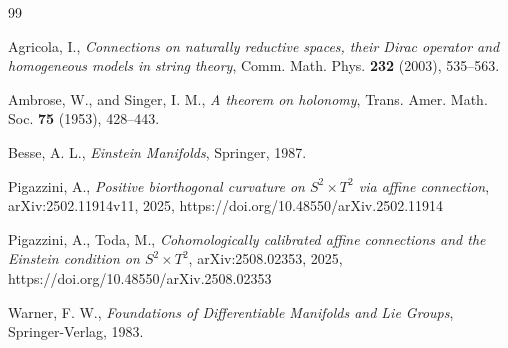 \documentclass[12pt]{article}
\begin{document}

\begin{thebibliography}{99}

 Agricola, I., \emph{Connections on naturally reductive spaces, their Dirac operator and homogeneous models in string theory}, Comm. Math. Phys. \textbf{232} (2003), 535--563.

 Ambrose, W., and Singer, I. M., \emph{A theorem on holonomy}, Trans. Amer. Math. Soc. \textbf{75} (1953), 428--443.

 Besse, A. L., \emph{Einstein Manifolds}, Springer, 1987.

Pigazzini, A., \emph{Positive biorthogonal curvature on $S^2 \times T^2$ via affine connection}, arXiv:2502.11914v11, 2025, 
https://doi.org/10.48550/arXiv.2502.11914

Pigazzini, A., Toda, M., \emph{Cohomologically calibrated affine connections and the Einstein condition on $S^2 \times T^2$}, arXiv:2508.02353, 2025, https://doi.org/10.48550/arXiv.2508.02353

Warner, F. W., \emph{Foundations of Differentiable Manifolds and Lie Groups}, Springer-Verlag, 1983.

\end{thebibliography}
\end{document}
